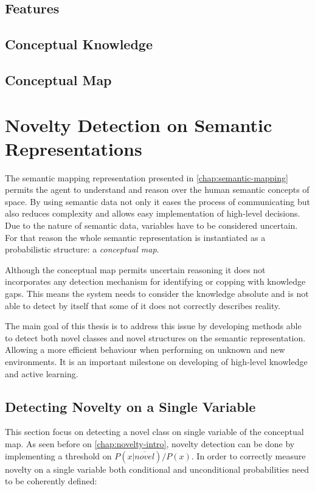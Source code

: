 \section{Features}

\section{Conceptual Knowledge}
\section{Conceptual Map}
\label{sec:clues-from-low-level}



\chapter{Novelty Detection on Semantic Representations}\label{chap:novelty}
The semantic mapping representation presented in \autoref{chap:semantic-mapping}
permits the agent to understand and reason over the human semantic concepts of
space. By using semantic data not only it eases the process of communicating 
but also reduces complexity and allows easy implementation of high-level
decisions.
Due to the nature of semantic data, variables have to be considered
uncertain. For that reason the whole semantic representation is instantiated
as a probabilistic structure: a \emph{conceptual map}. 

Although the conceptual map permits uncertain reasoning it does not incorporates
any detection mechanism for identifying or copping with knowledge gaps.
This means the system needs to consider the knowledge absolute and is not
able to detect by itself that some of it does not correctly describes reality. 

The main goal of this thesis is to address this issue by developing methods
able to detect both novel classes and novel structures on the semantic
representation. Allowing a more efficient behaviour when performing on unknown
and new environments. It is an important milestone on developing of high-level
knowledge and active learning.


\section{Detecting Novelty on a Single Variable}
This section focus on detecting a novel class on single variable of the
conceptual map. As seen before on \autoref{chap:novelty-intro},
novelty detection can be done by implementing a threshold on
$P(x|\overline{novel})/P(x)$.
In order to correctly measure novelty on a single variable both
conditional and unconditional probabilities need to be coherently defined:


